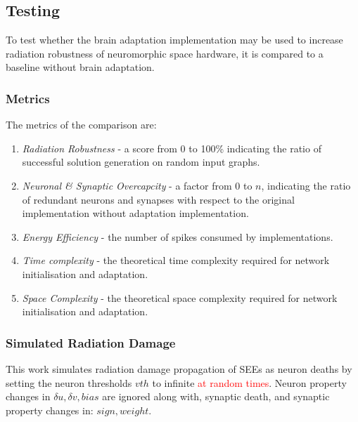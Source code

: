 \subsection{Testing}\label{subsec:testing}
To test whether the brain adaptation implementation may be used to increase radiation robustness of neuromorphic space hardware, it is compared to a baseline without brain adaptation. 

\subsubsection{Metrics}\label{subsubsec:metrics}
The metrics of the comparison are:
\begin{enumerate}
    \item \textit{Radiation Robustness} - a score from 0 to 100\% indicating the ratio of successful solution generation on random input graphs.
    \item \textit{Neuronal \& Synaptic Overcapcity} - a factor from 0 to $n$, indicating the ratio of redundant neurons and synapses with respect to the original implementation without adaptation implementation. %
    \item \textit{Energy Efficiency} - the number of spikes consumed by implementations.
    \item \textit{Time complexity} - the theoretical time complexity required for network initialisation and adaptation.
    \item \textit{Space Complexity} - the theoretical space complexity required for network initialisation and adaptation.
\end{enumerate}

\subsubsection{Simulated Radiation Damage}\label{subsubsec:simulated_radiation_damage}
This work simulates radiation damage propagation of SEEs as neuron deaths by setting the neuron thresholds $vth$ to infinite \textcolor{red}{at random times}. Neuron property changes in $\delta u,\delta v, bias$ are ignored along with, synaptic death, and synaptic property changes in: $sign,weight$.

